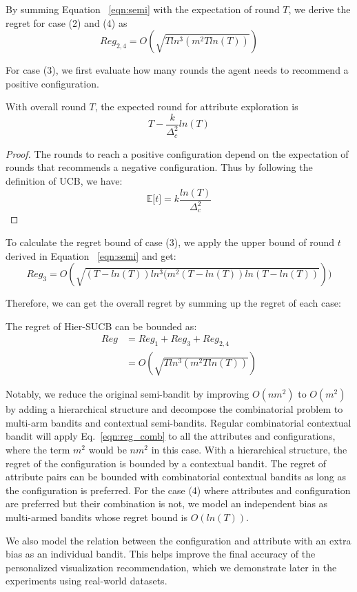 By summing Equation ~\ref{eqn:semi} with the expectation of round $T$, we derive the regret for case (2) and (4) as
\begin{equation}
    Reg_{2,4}=O(\sqrt{Tln^3(m^2Tln(T))})
    \label{eqn:reg_comb}
\end{equation}

For case (3), we first evaluate how many rounds the agent needs to recommend a positive configuration.
\begin{lemma}
With overall round $T$, the expected round for attribute exploration is 
\begin{equation}
    T-\frac{k}{\Delta_c^2}ln(T) 
    \label{eqn:tbound}
\end{equation}
\end{lemma}
\begin{proof}
The rounds to reach a positive configuration depend on the expectation of rounds that recommends a negative configuration. 
Thus by following the definition of UCB, we have:
\begin{equation}
    \mathbb{E}\lbrack t \rbrack= k\frac{ln(T)}{\Delta_c^2}
\end{equation}    
\renewcommand\qedsymbol{}
\end{proof}

To calculate the regret bound of case (3), we apply the upper bound of round $t$ derived in Equation ~\ref{eqn:semi} and get:
\begin{equation}
    Reg_3=O(\sqrt{(T-ln(T))ln^3(m^2(T-ln(T))ln(T-ln(T))}))
\end{equation}


Therefore, we can get the overall regret by summing up the regret of each case:
\begin{theorem}
The regret of Hier-SUCB can be bounded as:
\begin{align}
    Reg&=Reg_1+Reg_3+Reg_{2,4}\\
    &=O(\sqrt{Tln^3(m^2T ln(T))})
\end{align}
\end{theorem}


Notably, we reduce the original semi-bandit by improving $O(nm^2)$ to $O(m^2)$ by adding a hierarchical structure and decompose the combinatorial problem to multi-arm bandits and contextual semi-bandits. Regular combinatorial contextual bandit will apply Eq.~\ref{eqn:reg_comb} to all the attributes and configurations, where the term $m^2$ would be $nm^2$ in this case. With a hierarchical structure, the regret of the configuration is bounded by a contextual bandit. 
The regret of attribute pairs can be bounded with combinatorial contextual bandits as long as the configuration is preferred.
For the case (4) where attributes and configuration are preferred but their combination is not, we model an independent bias as multi-armed bandits  whose regret bound is $O(ln(T))$.

We also model the relation between the configuration and attribute with an extra bias as an individual bandit.
This helps improve the final accuracy of the personalized visualization recommendation, which we demonstrate later in the experiments using real-world datasets. 